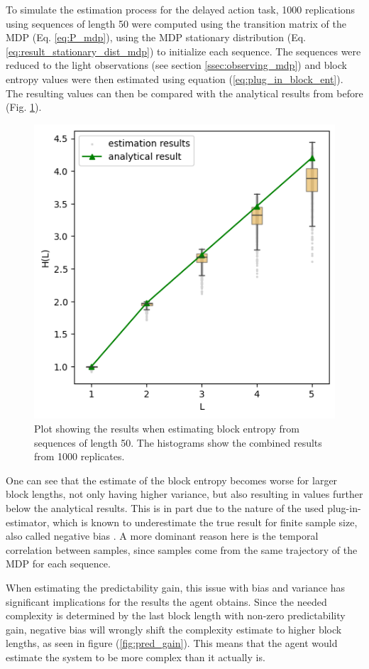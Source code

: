 \documentclass[12pt,a4paper]{article}
\begin{document}
To simulate the estimation process for the delayed action task, 1000 replications using sequences of length 50 were computed using the transition matrix of the MDP (Eq. \ref{eq:P_mdp}), using the MDP stationary distribution (Eq. \ref{eq:result_stationary_dist_mdp}) to initialize each sequence.
The sequences were reduced to the light observations (see section \ref{ssec:observing_mdp}) and block entropy values were then estimated using equation (\ref{eq:plug_in_block_ent}).
The resulting values can then be compared with the analytical results from before (Fig. \ref{fig:entropy_est}).

\begin{figure}[H]
    \centering
    \includegraphics[width=0.6\linewidth]{../figures/block_entropy_estimation_thesis.png}
    \caption{\label{fig:entropy_est} Plot showing the results when estimating block entropy from sequences of length 50. The histograms show the combined results from 1000 replicates.}
\end{figure}

One can see that the estimate of the block entropy becomes worse for larger block lengths, not only having higher variance, but also resulting in values further below the analytical results.
This is in part due to the nature of the used plug-in-estimator, which is known to underestimate the true result for finite sample size, also called negative bias \autocite{basharin1959plugin}.
A more dominant reason here is the temporal correlation between samples, since samples come from the same trajectory of the MDP for each sequence.

When estimating the predictability gain, this issue with bias and variance has significant implications for the results the agent obtains.
Since the needed complexity is determined by the last block length with non-zero predictability gain, negative bias will wrongly shift the complexity estimate to higher block lengths, as seen in figure (\ref{fig:pred_gain}).
This means that the agent would estimate the system to be more complex than it actually is.
\end{document}
